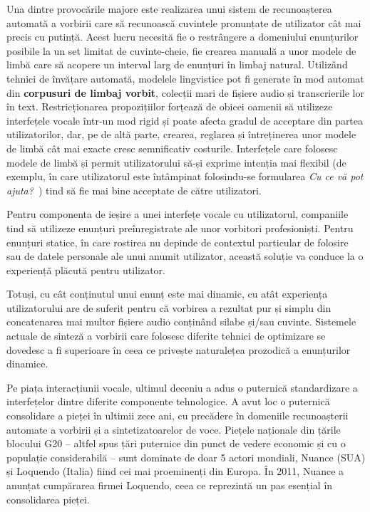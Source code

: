 \begin{multicols}{2}

Una dintre provocările majore este realizarea unui sistem de recunoașterea automată a vorbirii care să recunoască cuvintele pronunțate de utilizator cât mai precis cu putință. Acest lucru necesită fie o restrângere a domeniului enunțurilor posibile la un set limitat de cuvinte-cheie, fie crearea manuală a unor modele de limbă care să acopere un interval larg de enunțuri în limbaj natural. Utilizând tehnici de învățare automată, modelele lingvistice pot fi generate în mod automat din \textbf{corpusuri de limbaj vorbit}, colecții mari de fișiere audio și transcrierile lor în text. Restricționarea propozițiilor forțează de obicei oamenii să utilizeze interfețele vocale într-un mod rigid și poate afecta gradul de acceptare din partea utilizatorilor, dar, pe de altă parte, crearea, reglarea și întreținerea unor modele de limbă cât mai exacte cresc semnificativ costurile. Interfețele care folosesc modele de limbă și permit utilizatorului să-și exprime intenția mai flexibil (de exemplu, în care utilizatorul este întâmpinat folosindu-se formularea \textit{Cu ce vă pot ajuta?}~) tind să fie mai bine acceptate de către utilizatori.

Pentru componenta de ieșire a unei interfețe vocale cu utilizatorul, companiile tind să utilizeze enunțuri preînregistrate ale unor vorbitori profesioniști. Pentru enunțuri statice, în care rostirea nu depinde de contextul particular de folosire sau de datele personale ale unui anumit utilizator, această soluție va conduce la o experiență plăcută pentru utilizator. 

Totuși, cu cât conținutul unui enunț este mai dinamic, cu atât experiența utilizatorului are de suferit pentru că vorbirea a rezultat pur și simplu din concatenarea mai multor fișiere audio conținând silabe și/sau cuvinte. Sistemele actuale de sinteză a vorbirii care folosesc diferite tehnici de optimizare se dovedesc a fi superioare în ceea ce privește naturalețea prozodică a enunțurilor dinamice.

Pe piața interacțiunii vocale, ultimul deceniu a adus o puternică standardizare a interfețelor dintre diferite componente tehnologice. A avut loc o puternică consolidare a pieței în ultimii zece ani, cu precădere în domeniile recunoașterii automate a vorbirii și a sintetizatoarelor de voce. Piețele naționale din țările blocului G20 -- altfel spus țări puternice din punct de vedere economic și cu o populație considerabilă -- sunt dominate de doar 5 actori mondiali, Nuance (SUA) și Loquendo (Italia) fiind cei mai proeminenți din Europa. În 2011, Nuance a anunțat cumpărarea firmei Loquendo, ceea ce reprezintă un pas esențial în consolidarea pieței.


\end{multicols}
